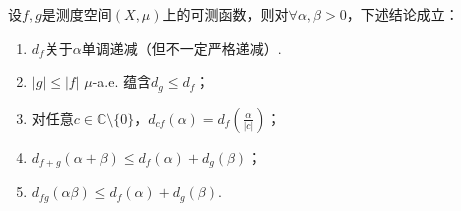\documentclass[../../main.tex]{subfiles}%
\begin{document}
\begin{proposition}[分布函数的基本性质]\label{proposition:分布函数的基本性质}
设$f,g$是测度空间$(X,\mu)$上的可测函数，则对$\forall \alpha,\beta>0$，下述结论成立：
\begin{enumerate}[(1)]
\item $d_f$关于$\alpha$单调递减（但不一定严格递减）.

\item $|g|\leqslant|f|$ $\mu$-a.e. 蕴含$d_g\leqslant d_f$；
\item 对任意$c\in\mathbb{C}\setminus\{0\}$，$d_{cf}(\alpha)=d_f\left(\frac{\alpha}{|c|}\right)$；
\item $d_{f+g}(\alpha+\beta)\leqslant d_f(\alpha)+d_g(\beta)$；
\item $d_{fg}(\alpha\beta)\leqslant d_f(\alpha)+d_g(\beta)$.
\end{enumerate}
\end{proposition}
\end{document}
